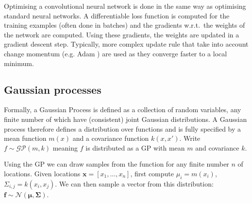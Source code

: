 \documentclass{article}
\begin{document}
Optimising a convolutional neural network is done in the same way as optimising standard neural networks. A differentiable loss function is computed for the training examples (often done in batches) and the gradients w.r.t.\ the weights of the network are computed. Using these gradients, the weights are updated in a gradient descent step. Typically, more complex update rule that take into account change momentum (e.g. Adam \cite{adam}) are used as they converge faster to a local minimum. 

\subsection{Gaussian processes}
Formally, a Gaussian Process is defined as a collection of random variables, any finite number of which have (consistent) joint Gaussian distributions. A Gaussian process therefore defines a distribution over functions and is fully specified by a mean function $m(x)$ and a covariance function $k(x, x')$. Write $f \sim \mathcal{GP}(m, k)$ meaning $f$ is distributed as a GP with mean $m$ and covariance $k$.

Using the GP we can draw samples from the function for any finite number $n$ of locations. Given locations $\mathbf{x} = [x_1, \dots, x_n]$, first compute $\mu_i = m(x_i)$, $\Sigma_{i,j} = k(x_i, x_j)$. We can then sample a vector from this distribution: $\mathbf{f} \sim \mathcal{N}(\mathbf{\mu}, \mathbf{\Sigma})$.
\end{document}
